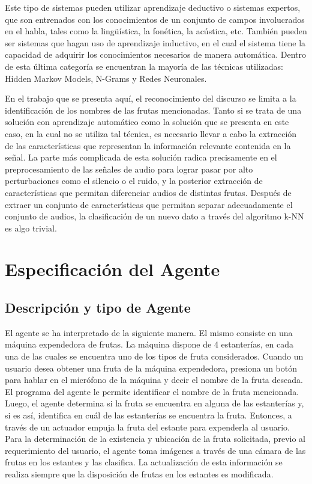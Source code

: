 \documentclass[a4paper, 12pt]{article}
\begin{document}
Este tipo de sistemas pueden utilizar aprendizaje deductivo o sistemas expertos, que son entrenados con los conocimientos de un conjunto de campos involucrados en el habla, tales como la lingüística, la fonética, la acústica, etc. También pueden ser sistemas que hagan uso de aprendizaje inductivo, en el cual el sistema tiene la capacidad de adquirir los conocimientos necesarios de manera automática. Dentro de esta última categoría se encuentran la mayoría de las técnicas utilizadas: Hidden Markov Models, N-Grams y Redes Neuronales.

En el trabajo que se presenta aquí, el reconocimiento del discurso se limita a la identificación de los nombres de las frutas mencionadas. Tanto si se trata de una solución con aprendizaje automático como la solución que se presenta en este caso, en la cual no se utiliza tal técnica, es necesario llevar a cabo la extracción de las características que representan la información relevante contenida en la señal. La parte más complicada de esta solución radica precisamente en el preprocesamiento de las señales de audio para lograr pasar por alto perturbaciones como el silencio o el ruido, y la posterior extracción de características que permitan diferenciar audios de distintas frutas. Después de extraer un conjunto de características que permitan separar adecuadamente el conjunto de audios, la clasificación de un nuevo dato a través del algoritmo k-NN es algo trivial.
\section{Especificación del Agente}
\subsection{Descripción y tipo de Agente}

El agente se ha interpretado de la siguiente manera. El mismo consiste en una máquina expendedora de frutas. La máquina dispone de 4 estanterías, en cada una de las cuales se encuentra uno de los tipos de fruta considerados. Cuando un usuario desea obtener una fruta de la máquina expendedora, presiona un botón para hablar en el micrófono de la máquina y decir el nombre de la fruta deseada. El programa del agente le permite identificar el nombre de la fruta mencionada. Luego, el agente determina si la fruta se encuentra en alguna de las estanterías y, si es así, identifica en cuál de las estanterías se encuentra la fruta. Entonces, a través de un actuador empuja la fruta del estante para expenderla al usuario. Para la determinación de la existencia y ubicación de la fruta solicitada, previo al requerimiento del usuario, el agente toma imágenes a través de una cámara de las frutas en los estantes y las clasifica. La actualización de esta información se realiza siempre que la disposición de frutas en los estantes es modificada.
\end{document}
